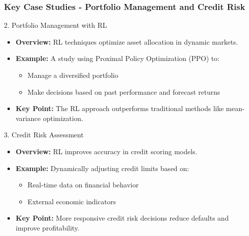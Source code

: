 \documentclass[aspectratio=169]{beamer}
\begin{document}
\begin{frame}[fragile]
    \frametitle{Key Case Studies - Portfolio Management and Credit Risk}
    \begin{block}{2. Portfolio Management with RL}
        \begin{itemize}
            \item \textbf{Overview:} RL techniques optimize asset allocation in dynamic markets.
            \item \textbf{Example:} A study using Proximal Policy Optimization (PPO) to:
            \begin{itemize}
                \item Manage a diversified portfolio
                \item Make decisions based on past performance and forecast returns
            \end{itemize}
            \item \textbf{Key Point:} The RL approach outperforms traditional methods like mean-variance optimization.
        \end{itemize}
    \end{block}
    
    \begin{block}{3. Credit Risk Assessment}
        \begin{itemize}
            \item \textbf{Overview:} RL improves accuracy in credit scoring models.
            \item \textbf{Example:} Dynamically adjusting credit limits based on:
            \begin{itemize}
                \item Real-time data on financial behavior
                \item External economic indicators
            \end{itemize}
            \item \textbf{Key Point:} More responsive credit risk decisions reduce defaults and improve profitability.
        \end{itemize}
    \end{block}
\end{frame}
\end{document}
